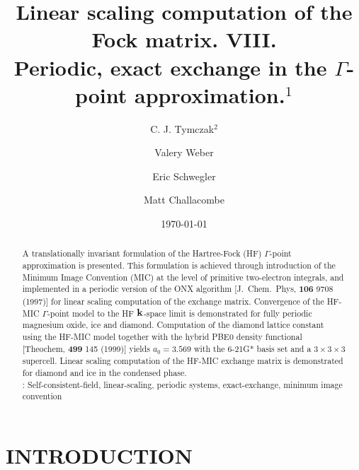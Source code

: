 \documentclass[prb,aps,nobibnotes,twocolumn,doublespace,twocolumngrid,superbib,showpacs]{revtex4}
\begin{document}
\title{Linear scaling computation of the Fock matrix. VIII. \\ 
       Periodic, exact exchange in the $\Gamma$-point approximation.$^1$ }

\author{C. J. Tymczak$^2$}
\author{Valery Weber}
\author{Eric Schwegler}
\author{Matt Challacombe}





\date{\today}
\begin{abstract}
A translationally invariant formulation of the Hartree-Fock (HF) $\Gamma$-point approximation
is presented.   This formulation is achieved through introduction of  the  Minimum Image Convention (MIC) at 
the level of primitive two-electron integrals, and implemented in a periodic version of the 
ONX algorithm [J.~Chem.~Phys, {\bf 106} 9708 (1997)] for linear scaling computation of the
exchange matrix. Convergence of the HF-MIC $\Gamma$-point model to the HF ${\bf k}$-space limit 
is demonstrated for fully periodic magnesium oxide, ice and diamond.  Computation of the diamond
lattice constant using the HF-MIC model together with the hybrid PBE0 density functional 
[Theochem, {\bf 499} 145 (1999)] yields $a_0=3.569$ with the 6-21G* basis set and a 
$3\times3\times3$ supercell.  Linear scaling computation of the HF-MIC exchange matrix is demonstrated 
for diamond and ice in the condensed phase. \\
: Self-consistent-field, linear-scaling, periodic systems, exact-exchange, minimum image convention
\end{abstract}


\maketitle


\section{INTRODUCTION}
\end{document}
